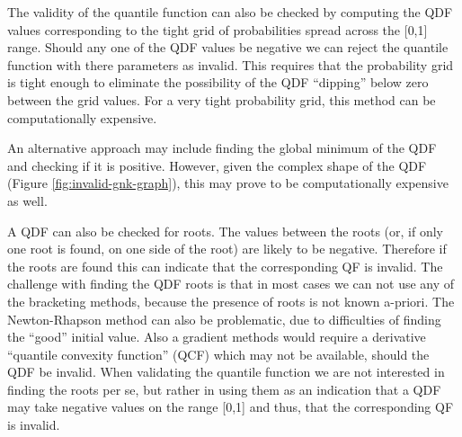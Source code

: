 \documentclass[
  12pt,
]{article}
\begin{document}
The validity of the quantile function can also be checked by computing the QDF values corresponding to the tight grid of probabilities spread across the {[}0,1{]} range. Should any one of the QDF values be negative we can reject the quantile function with there parameters as invalid. This requires that the probability grid is tight enough to eliminate the possibility of the QDF ``dipping'' below zero between the grid values. For a very tight probability grid, this method can be computationally expensive.

An alternative approach may include finding the global minimum of the QDF and checking if it is positive. However, given the complex shape of the QDF (Figure \ref{fig:invalid-gnk-graph}), this may prove to be computationally expensive as well.

A QDF can also be checked for roots. The values between the roots (or, if only one root is found, on one side of the root) are likely to be negative. Therefore if the roots are found this can indicate that the corresponding QF is invalid. The challenge with finding the QDF roots is that in most cases we can not use any of the bracketing methods, because the presence of roots is not known a-priori. The Newton-Rhapson method can also be problematic, due to difficulties of finding the ``good'' initial value. Also a gradient methods would require a derivative ``quantile convexity function'' (QCF) which may not be available, should the QDF be invalid. When validating the quantile function we are not interested in finding the roots per se, but rather in using them as an indication that a QDF may take negative values on the range {[}0,1{]} and thus, that the corresponding QF is invalid.
\end{document}
